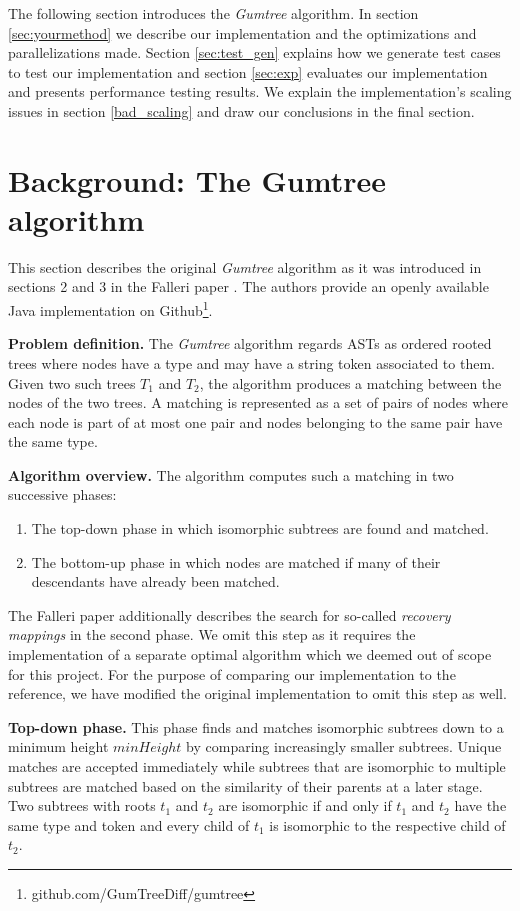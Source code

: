 \documentclass[letterpaper]{article}
\newcommand{\mypar}[1]{{\bf #1.}}
\begin{document}
The following section introduces the \emph{Gumtree} algorithm. In section \ref{sec:yourmethod} we describe our implementation and the optimizations and parallelizations made. Section \ref{sec:test_gen} explains how we generate test cases to test our implementation and section  \ref{sec:exp} evaluates our implementation and presents performance testing results.
We explain the implementation's scaling issues in section \ref{bad_scaling} and draw our conclusions in the final section.

\section{Background: The Gumtree algorithm}\label{sec:background}

This section describes the original \emph{Gumtree} algorithm as it was introduced in sections 2 and 3 in the Falleri paper \cite{falleri:2014:structure_diff}. The authors provide an openly available Java implementation on Github\footnote{github.com/GumTreeDiff/gumtree}.

\mypar{Problem definition}
The \emph{Gumtree} algorithm regards ASTs as ordered rooted trees where nodes have a type and may have a string token associated to them.
Given two such trees $T_1$ and $T_2$, the algorithm produces a matching between the nodes of the two trees.
A matching is represented as a set of pairs of nodes where each node is part of at most one pair and nodes belonging to the same pair have the same type.

\mypar{Algorithm overview}
The algorithm computes such a matching in two successive phases:
\begin{enumerate}
	\item The top-down phase in which isomorphic subtrees are found and matched.
	\item The bottom-up phase in which nodes are matched if many of their descendants have already been matched.
\end{enumerate}
The Falleri paper additionally describes the search for so-called \emph{recovery mappings} in the second phase.
We omit this step as it requires the implementation of a separate optimal algorithm which we deemed out of scope for this project.
For the purpose of comparing our implementation to the reference, we have modified the original implementation to omit this step as well.

\mypar{Top-down phase}
This phase finds and matches isomorphic subtrees down to a minimum height $minHeight$ by comparing increasingly smaller subtrees.
Unique matches are accepted immediately while subtrees that are isomorphic to multiple subtrees are matched based on the similarity of their parents at a later stage.
Two subtrees with roots $t_1$ and $t_2$ are isomorphic if and only if $t_1$ and $t_2$ have the same type and token and every child of $t_1$ is isomorphic to the respective child of $t_2$.
\end{document}
